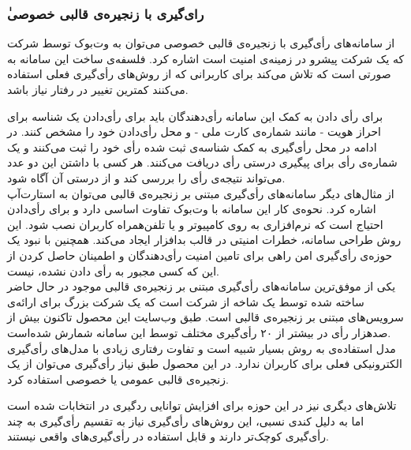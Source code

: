 \subsubsection{ٰرای‌گیری با زنجیره‌ی قالبی خصوصی}
از سامانه‌های رأی‌گیری با زنجیره‌ی قالبی خصوصی می‌توان به وت‌بوک
\cite{votebook}
توسط شرکت 
که یک شرکت پیشرو در زمینه‌ی امنیت است اشاره کرد. فلسفه‌ی ساخت این سامانه به صورتی است که تلاش می‌کند برای کاربرانی که از روش‌های رأی‌گیری فعلی استفاده می‌کنند کمترین تغییر در رفتار نیاز باشد.
\par 
 برای رأی دادن به کمک این سامانه رأی‌دهندگان باید برای رأی‌دادن یک شناسه‌ برای احراز هویت - مانند شماره‌ی کارت ملی - و محل رأی‌دادن خود را مشخص کنند. در ادامه در محل رأی‌گیری به کمک شناسه‌ی ثبت شده رأی خود را ثبت می‌کنند و یک شماره‌ی رأی برای پیگیری درستی رأی دریافت می‌کنند. هر کسی با داشتن این دو عدد می‌تواند نتیجه‌ی رأی را بررسی کند و از درستی آن آگاه شود. 
\\
از مثال‌های دیگر سامانه‌های رأی‌گیری مبتنی بر زنجیره‌ی قالبی می‌توان به استارت‌آپ 
اشاره کرد. نحوه‌ی کار این سامانه با  
وت‌بوک
تفاوت اساسی دارد و برای رأی‌دادن احتیاج است که نرم‌‌افزاری به روی کامپیوتر و یا تلفن‌همراه کاربران نصب شود. این روش طراحی سامانه،‌ خطرات امنیتی در قالب بدافزار ایجاد می‌کند. همچنین با نبود یک حوزه‌ی رأی‌گیری امن راهی برای تامین امنیت رأی‌دهندگان و اطمینان حاصل کردن از این که کسی مجبور به رأی‌ دادن نشده، نیست.
\\
یکی از موفق‌ترین سامانه‌های رأی‌گیری مبتنی بر زنجیره‌ی قالبی موجود در حال حاضر 
ساخته شده توسط یک شاخه از شرکت 
است که یک شرکت بزرگ برای ارائه‌ی سرویس‌های مبتنی بر زنجیره‌ی قالبی است. طبق وب‌سایت این محصول تاکنون بیش از صدهزار رأی در بیشتر از ۲۰ رأی‌گیری مختلف توسط این سامانه‌ شمارش شده‌است. 
\\
مدل استفاده‌ی 
به روش‌ 
بسیار شبیه است و تفاوت رفتاری زیادی با مدل‌های رأی‌گیری الکترونیکی فعلی برای کاربران ندارد. در این محصول طبق نیاز رأی‌گیری می‌توان از یک زنجیره‌ی قالبی عمومی یا خصوصی استفاده کرد.
\par
تلاش‌های دیگری نیز در این حوزه برای افزایش توانایی ردگیری در انتخابات شده است
\cite{privblock}
اما به دلیل کندی نسبی، این روش‌های رأی‌گیری نیاز به تقسیم رأی‌گیری به چند رأی‌گیری کوچک‌تر دارند و قابل استفاده در رأی‌گیری‌های واقعی نیستند.


